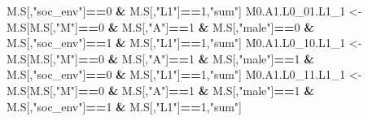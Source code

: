 \documentclass[
]{book}
\newenvironment{Shaded}{\begin{snugshade}}{\end{snugshade}}
\newcommand{\DecValTok}[1]{\textcolor[rgb]{0.00,0.00,0.81}{#1}}
\newcommand{\NormalTok}[1]{#1}
\newcommand{\OtherTok}[1]{\textcolor[rgb]{0.56,0.35,0.01}{#1}}
\newcommand{\SpecialCharTok}[1]{\textcolor[rgb]{0.81,0.36,0.00}{\textbf{#1}}}
\newcommand{\StringTok}[1]{\textcolor[rgb]{0.31,0.60,0.02}{#1}}
\begin{document}
\begin{Shaded}
\begin{Highlighting}[]
\NormalTok{                            M.S[,}\StringTok{"soc\_env"}\NormalTok{]}\SpecialCharTok{==}\DecValTok{0} \SpecialCharTok{\&}\NormalTok{ M.S[,}\StringTok{"L1"}\NormalTok{]}\SpecialCharTok{==}\DecValTok{1}\NormalTok{,}\StringTok{"sum"}\NormalTok{]}
\NormalTok{  M0.A1.L0\_01.L1\_1 }\OtherTok{\textless{}{-}}\NormalTok{ M.S[M.S[,}\StringTok{"M"}\NormalTok{]}\SpecialCharTok{==}\DecValTok{0} \SpecialCharTok{\&}\NormalTok{ M.S[,}\StringTok{"A"}\NormalTok{]}\SpecialCharTok{==}\DecValTok{1} \SpecialCharTok{\&}\NormalTok{ M.S[,}\StringTok{"male"}\NormalTok{]}\SpecialCharTok{==}\DecValTok{0} \SpecialCharTok{\&} 
\NormalTok{                            M.S[,}\StringTok{"soc\_env"}\NormalTok{]}\SpecialCharTok{==}\DecValTok{1} \SpecialCharTok{\&}\NormalTok{ M.S[,}\StringTok{"L1"}\NormalTok{]}\SpecialCharTok{==}\DecValTok{1}\NormalTok{,}\StringTok{"sum"}\NormalTok{]}
\NormalTok{  M0.A1.L0\_10.L1\_1 }\OtherTok{\textless{}{-}}\NormalTok{ M.S[M.S[,}\StringTok{"M"}\NormalTok{]}\SpecialCharTok{==}\DecValTok{0} \SpecialCharTok{\&}\NormalTok{ M.S[,}\StringTok{"A"}\NormalTok{]}\SpecialCharTok{==}\DecValTok{1} \SpecialCharTok{\&}\NormalTok{ M.S[,}\StringTok{"male"}\NormalTok{]}\SpecialCharTok{==}\DecValTok{1} \SpecialCharTok{\&} 
\NormalTok{                            M.S[,}\StringTok{"soc\_env"}\NormalTok{]}\SpecialCharTok{==}\DecValTok{0} \SpecialCharTok{\&}\NormalTok{ M.S[,}\StringTok{"L1"}\NormalTok{]}\SpecialCharTok{==}\DecValTok{1}\NormalTok{,}\StringTok{"sum"}\NormalTok{]}
\NormalTok{  M0.A1.L0\_11.L1\_1 }\OtherTok{\textless{}{-}}\NormalTok{ M.S[M.S[,}\StringTok{"M"}\NormalTok{]}\SpecialCharTok{==}\DecValTok{0} \SpecialCharTok{\&}\NormalTok{ M.S[,}\StringTok{"A"}\NormalTok{]}\SpecialCharTok{==}\DecValTok{1} \SpecialCharTok{\&}\NormalTok{ M.S[,}\StringTok{"male"}\NormalTok{]}\SpecialCharTok{==}\DecValTok{1} \SpecialCharTok{\&} 
\NormalTok{                            M.S[,}\StringTok{"soc\_env"}\NormalTok{]}\SpecialCharTok{==}\DecValTok{1} \SpecialCharTok{\&}\NormalTok{ M.S[,}\StringTok{"L1"}\NormalTok{]}\SpecialCharTok{==}\DecValTok{1}\NormalTok{,}\StringTok{"sum"}\NormalTok{]}
  

\end{Highlighting}
\end{Shaded}
\end{document}
